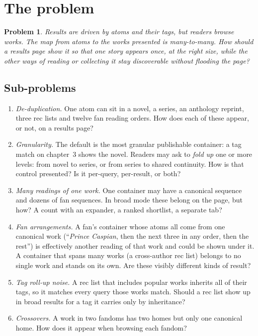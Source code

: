 \documentclass{amsart}
\newtheorem*{prob}{Problem}
\theoremstyle{remark}
\begin{document}
\section{The problem}
\begin{prob}
Results are driven by atoms and their tags, but readers browse works. The map from atoms to the works presented is many-to-many. How should a results page show it so that one story appears once, at the right size, while the other ways of reading or collecting it stay discoverable without flooding the page?
\end{prob}

\subsection{Sub-problems}
\begin{enumerate}
\item \emph{De-duplication.} One atom can sit in a novel, a series, an anthology reprint, three rec lists and twelve fan reading orders. How does each of these appear, or not, on a results page?
\item \emph{Granularity.} The default is the most granular publishable container: a tag match on chapter~3 shows the novel. Readers may ask to \emph{fold up} one or more levels: from novel to series, or from series to shared continuity. How is that control presented? Is it per-query, per-result, or both?
\item \emph{Many readings of one work.} One container may have a canonical sequence and dozens of fan sequences. In broad mode these belong on the page, but how? A count with an expander, a ranked shortlist, a separate tab?
\item \emph{Fan arrangements.} A fan's container whose atoms all come from one canonical work (``\emph{Prince Caspian}, then the next three in any order, then the rest'') is effectively another reading of that work and could be shown under it. A container that spans many works (a cross-author rec list) belongs to no single work and stands on its own. Are these visibly different kinds of result?
\item \emph{Tag roll-up noise.} A rec list that includes popular works inherits all of their tags, so it matches every query those works match. Should a rec list show up in broad results for a tag it carries only by inheritance?
\item \emph{Crossovers.} A work in two fandoms has two homes but only one canonical home. How does it appear when browsing each fandom?
\end{enumerate}
\end{document}
